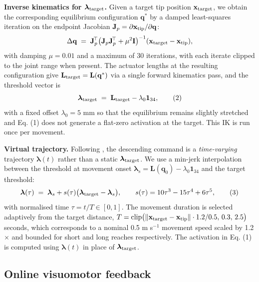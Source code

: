 \documentclass[sn-basic]{sn-jnl}
\begin{document}
\textbf{Inverse kinematics for \(\boldsymbol{\lambda}_{\rm target}\).}
Given a target tip position \(\mathbf{x}_{\rm target}\), we obtain the
corresponding equilibrium configuration \(\mathbf{q}^{*}\) by a damped
least-squares iteration on the endpoint Jacobian
\(\mathbf{J}_p = \partial \mathbf{x}_{\rm tip}/\partial \mathbf{q}\): \[
\Delta\mathbf{q} \;=\; \mathbf{J}_p^{\!\top}\bigl(\mathbf{J}_p \mathbf{J}_p^{\!\top}+ \mu^2 \mathbf{I}\bigr)^{-1}(\mathbf{x}_{\rm target}-\mathbf{x}_{\rm tip}),
\] with damping \(\mu = 0.01\) and a maximum of 30 iterations, with each
iterate clipped to the joint range when present. The actuator lengths at
the resulting configuration give
\(\mathbf{L}_{\rm target} = \mathbf{L}(\mathbf{q}^{*})\) via a single
forward kinematics pass, and the threshold vector is \[
\boldsymbol{\lambda}_{\rm target} \;=\; \mathbf{L}_{\rm target} - \lambda_{0}\mathbf{1}_{34}, \tag{2}
\] with a fixed offset \(\lambda_{0} = 5\) mm so that the equilibrium
remains slightly stretched and Eq. (1) does not generate a flat-zero
activation at the target. This IK is run once per movement.

\textbf{Virtual trajectory.} Following \citet{feldmanlevin1995}, the
descending command is a \emph{time-varying} trajectory
\(\boldsymbol{\lambda}(t)\) rather than a static
\(\boldsymbol{\lambda}_{\rm target}\). We use a min-jerk interpolation
\citep{flashhogan1985} between the threshold at movement onset
\(\boldsymbol{\lambda}_{s} = \mathbf{L}(\mathbf{q}_{0}) - \lambda_{0}\mathbf{1}_{34}\)
and the target threshold: \[
\boldsymbol{\lambda}(\tau) \;=\; \boldsymbol{\lambda}_{s} + s(\tau)\bigl(\boldsymbol{\lambda}_{\rm target}-\boldsymbol{\lambda}_{s}\bigr),
\qquad s(\tau) = 10\tau^{3}-15\tau^{4}+6\tau^{5}, \tag{3}
\] with normalised time \(\tau = t/T \in [0,1]\). The movement duration
is selected adaptively from the target distance,
\(T = \mathrm{clip}\bigl(\|\mathbf{x}_{\rm target}-\mathbf{x}_{\rm tip}\|\cdot 1.2/0.5,\,0.3,\,2.5\bigr)\)
seconds, which corresponds to a nominal 0.5 m s\(^{-1}\) movement speed
scaled by 1.2$\times$ and bounded for short and long reaches respectively. The
activation in Eq. (1) is computed using \(\boldsymbol{\lambda}(t)\) in
place of \(\boldsymbol{\lambda}_{\rm target}\).

\subsection{Online visuomotor
feedback}
\end{document}
